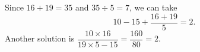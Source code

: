 Since $16+19=35$ and $35\div5=7$, we can take
\[\boxed{10-15+\dfrac{16+19}{5}=2}.\]
Another solution is $\dfrac{10\times16}{19\times5-15}=\dfrac{160}{80}=2$.
